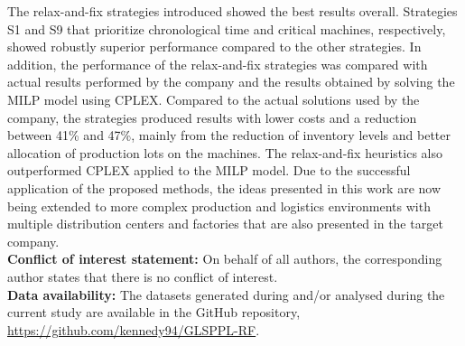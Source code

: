 \documentclass[11pt]{article}
\begin{document}
The relax-and-fix strategies introduced showed the best results overall. Strategies S1 and S9 that prioritize chronological time and critical machines, respectively, showed robustly superior performance compared to the other strategies. In addition, the performance of the relax-and-fix strategies was compared with actual results performed by the company and the results obtained by solving the MILP model using CPLEX. Compared to the actual solutions used by the company, the strategies produced results with lower costs and a reduction between 41\% and 47\%, mainly from the reduction of inventory levels and better allocation of production lots on the machines. The relax-and-fix heuristics also outperformed CPLEX applied to the MILP model. Due to the successful application of the proposed methods, the ideas presented in this work are now being extended to more complex production and logistics environments with multiple distribution centers and factories that are also presented in the target company.\\

\noindent
\textbf{Conflict of interest statement:} On behalf of all authors, the corresponding author states that there is no conflict of interest.\\

\noindent
\textbf{Data availability:} The datasets generated during and/or analysed during the current study are available in the GitHub repository, \url{https://github.com/kennedy94/GLSPPL-RF}.




\end{document}
